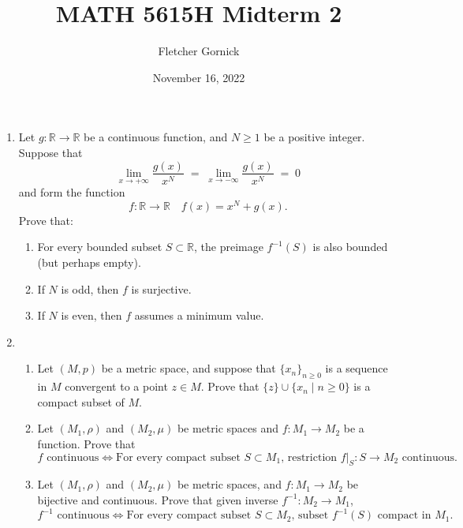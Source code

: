 \documentclass[11pt]{article}
\title{\vspace{-1.0cm}MATH 5615H Midterm 2}
\author{Fletcher Gornick}
\date{November 16, 2022}
\begin{document}
\maketitle
\newpage
\begin{enumerate}
  \item Let \(g \colon \mathbb{R} \to \mathbb{R}\) be a continuous function, and \(N \geq 1\) be a positive 
    integer.  Suppose that
    \[\lim_{x \to +\infty} \frac{g(x)}{x^N} \;=\; \lim_{x \to -\infty} \frac{g(x)}{x^N} \;=\; 0\]
    and form the function
    \[f \colon \mathbb{R} \to \mathbb{R} \quad f(x) = x^N + g(x).\]
    Prove that:
    \begin{enumerate}[label=(\alph*)]
      \item For every bounded subset \(S \subset \mathbb{R}\), the preimage \(f^{-1}(S)\) is also bounded (but 
        perhaps empty).
      \item If \(N\) is odd, then \(f\) is surjective.
      \item If \(N\) is even, then \(f\) assumes a minimum value.
    \end{enumerate}
    \newpage

  \item \begin{enumerate}[label=(\alph*)]
    \item Let \((M,p)\) be a metric space, and suppose that \(\{x_n\}_{n \geq 0}\) is a sequence in \(M\) 
    convergent to a point \(z \in M\).  Prove that \(\{z\} \cup \{x_n \mid n \geq 0\}\) is a compact subset of 
    \(M\).
  \item Let \((M_1, \rho)\) and \((M_2, \mu)\) be metric spaces and \(f \colon M_1 \to M_2\) be a function.  
    Prove that 
      \[\text{\(f\) continuous} \iff \text{For every compact subset \(S \subset M_1\), restriction 
      \(f|_S \colon S \to M_2\) continuous.}\]
  \item Let \((M_1, \rho)\) and \((M_2, \mu)\) be metric spaces, and \(f \colon M_1 \to M_2\) be bijective and 
    continuous.  Prove that given inverse \(f^{-1} \colon M_2 \to M_1\),
      \[\text{\(f^{-1}\) continuous} \iff \text{For every compact subset 
      \(S \subset M_2\), subset \(f^{-1}(S)\) compact in \(M_1\).}\]

  \end{enumerate}
\end{enumerate}
\end{document}
